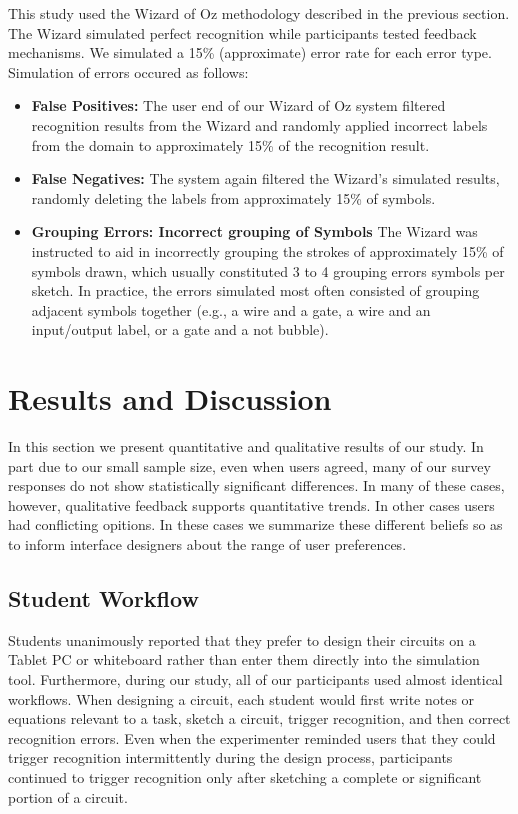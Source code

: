\documentclass{egpubl}
\begin{document}
This study used the Wizard of Oz methodology described in the previous
section.  The Wizard simulated perfect recognition while participants
tested feedback mechanisms.  We simulated a 15\% (approximate) error
rate for each error type.  Simulation of errors occured as follows:
\begin{itemize}
\item \textbf{False Positives:} The user end of our Wizard
of Oz system filtered recognition results from the Wizard and randomly
applied incorrect labels from the domain to approximately 15\% of the
recognition result.
\item \textbf{False Negatives:} The system again filtered the Wizard's simulated results,
randomly deleting the labels from approximately 15\% of symbols.
\item \textbf{Grouping Errors: Incorrect grouping of Symbols} The
Wizard was instructed to aid in incorrectly grouping the strokes of
approximately 15\% of symbols drawn, which usually constituted 3 to 4
grouping errors symbols per sketch.  In practice, the errors simulated
most often consisted of grouping adjacent symbols together (e.g., a
wire and a gate, a wire and an input/output label, or a gate and a not
bubble).
\end{itemize}

\section{Results and Discussion}
In this section we present quantitative and qualitative results of our
study.  In part due to our small sample size, even when users agreed,
many of our survey responses do not show statistically significant
differences.  In many of these cases, however, qualitative feedback
supports quantitative trends.  In other cases users had conflicting
opitions.  In these cases we summarize these different beliefs so as
to inform interface designers about the range of user preferences.

\subsection{Student Workflow}

Students unanimously reported that they prefer to design their
circuits on a Tablet PC or whiteboard rather than enter them directly
into the simulation tool.  Furthermore, during our study, all of our
participants used almost identical workflows.  When designing a
circuit, each student would first write notes or equations relevant to
a task, sketch a circuit, trigger recognition, and then correct
recognition errors.  Even when the experimenter reminded users that
they could trigger recognition intermittently during the design
process, participants continued to trigger recognition only after
sketching a complete or significant portion of a circuit.
\end{document}
